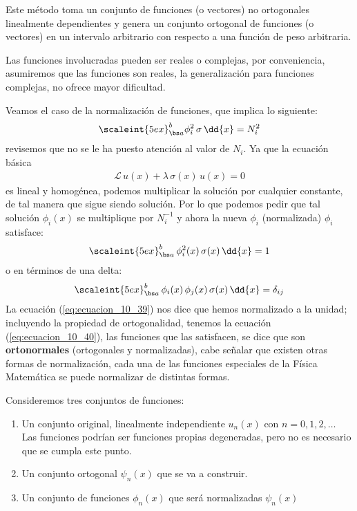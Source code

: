 Este método toma un conjunto de funciones (o vectores) no ortogonales linealmente dependientes y genera un conjunto ortogonal de funciones (o vectores) en un intervalo arbitrario con respecto a una función de peso arbitraria.
\par
Las funciones involucradas pueden ser reales o complejas, por conveniencia, asumiremos que las funciones son reales, la generalización para funciones complejas, no ofrece mayor dificultad.
\par
Veamos el caso de la normalización de funciones, que implica lo siguiente:
\begin{align*}
\scaleint{5ex}_{\bs a}^{b} \phi_{i}^{2} \, \sigma  \, \dd{x}  =  N_{i}^{2}
\end{align*}
revisemos que no se le ha puesto atención al valor de $N_{i}$. Ya que la ecuación básica 
\begin{align}
\mathcal{L} \, u(x) + \lambda \, \sigma(x) \, u(x) = 0
\label{eq:ecuacion_10_08}
\end{align}
es lineal y homogénea, podemos multiplicar la solución por cualquier constante, de tal manera que sigue siendo solución. Por lo que podemos pedir que tal solución $\phi_{i}(x)$ se multiplique por $N_{i}^{-1}$ y ahora la nueva $\phi_{i}$ (normalizada) $\phi_{i}$ satisface:
\begin{align}
\scaleint{5ex}_{\bs a}^{b} \, \phi_{i}^{2} (x) \, \sigma(x) \, \dd{x} = 1
\label{eq:ecuacion_10_39}
\end{align}
o en términos de una delta:
\begin{align}
\scaleint{5ex}_{\bs a}^{b} \, \phi_{i}(x) \, \phi_{j} (x) \, \sigma (x) \, \dd{x} = \delta_{ij}
\label{eq:ecuacion_10_40}
\end{align}
La ecuación (\ref{eq:ecuacion_10_39}) nos dice que hemos normalizado a la unidad; incluyendo la propiedad de ortogonalidad, tenemos la ecuación (\ref{eq:ecuacion_10_40}), las funciones que las satisfacen, se dice que son \textbf{ortonormales} (ortogonales y normalizadas), cabe señalar que existen otras formas de normalización, cada una de las funciones especiales de la Física Matemática se puede normalizar de distintas formas.
\par
Consideremos tres conjuntos de funciones:
\begin{enumerate}
\item Un conjunto original, linealmente independiente $u_{n}(x)$ con $n=0,1,2,\ldots$ \\
Las funciones podrían ser funciones propias degeneradas, pero no es necesario que se cumpla este punto.
\item Un conjunto ortogonal $\psi_{n}(x)$ que se va a construir.
\item Un conjunto de funciones $\phi_{n}(x)$ que será normalizadas $\psi_{n}(x)$
\end{enumerate}
